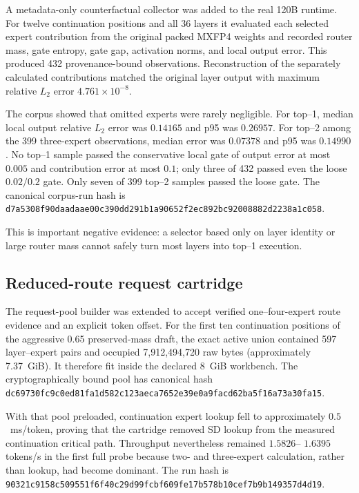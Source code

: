 A metadata-only counterfactual collector was added to the real 120B runtime.
For twelve continuation positions and all 36 layers it evaluated each selected
expert contribution from the original packed MXFP4 weights and recorded router
mass, gate entropy, gate gap, activation norms, and local output error.  This
produced 432 provenance-bound observations.  Reconstruction of the separately
calculated contributions matched the original layer output with maximum
relative $L_2$ error $4.761\times10^{-8}$.

The corpus showed that omitted experts were rarely negligible.  For top--1,
median local output relative $L_2$ error was $0.14165$ and p95 was $0.26957$.
For top--2 among the 399 three-expert observations, median error was $0.07378$
and p95 was $0.14990$.  No top--1 sample passed the conservative local gate of
output error at most $0.005$ and contribution error at most $0.1$; only three
of 432 passed even the loose $0.02/0.2$ gate.  Only seven of 399 top--2 samples
passed the loose gate.  The canonical corpus-run hash is
\texttt{d7a5308f90daadaae00c390dd291b1a90652f2ec892bc92008882d2238a1c058}.

This is important negative evidence: a selector based only on layer identity or
large router mass cannot safely turn most layers into top--1 execution.

\subsection{Reduced-route request cartridge}

The request-pool builder was extended to accept verified one--four-expert route
evidence and an explicit token offset.  For the first ten continuation
positions of the aggressive 0.65 preserved-mass draft, the exact active union
contained 597 layer--expert pairs and occupied 7,912,494,720 raw bytes
(approximately 7.37~GiB).  It therefore fit inside the declared 8~GiB
workbench.  The cryptographically bound pool has canonical hash
\texttt{dc69730fc9c0ed81fa1d582c123aeca7652e39e0a9facd62ba5f16a73a30fa15}.

With that pool preloaded, continuation expert lookup fell to approximately
$0.5$~ms/token, proving that the cartridge removed SD lookup from the measured
continuation critical path.  Throughput nevertheless remained $1.5826$--
$1.6395$ tokens/s in the first full probe because two- and three-expert
calculation, rather than lookup, had become dominant.  The run hash is
\texttt{90321c9158c509551f6f40c29d99fcbf609fe17b578b10cef7b9b149357d4d19}.

